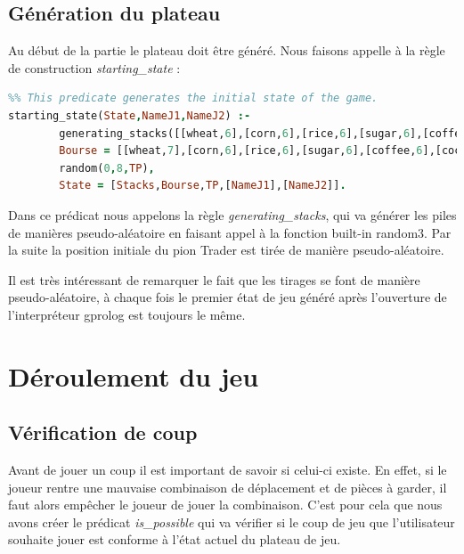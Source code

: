 \documentclass[a4paper, 11pt,twoside, leqno]{report}
\theoremstyle{plain}
\begin{document}
\subsection{Génération du plateau}
Au début de la partie le plateau doit être généré. Nous faisons appelle à la règle de construction \textit{starting\_{}state} :
\begin{lstlisting}[language=prolog]
%%%% starting_state(?State_To_Be_Generated,+Player_1's_Name,+Player_1's_Name)
%% This predicate generates the initial state of the game. 
starting_state(State,NameJ1,NameJ2) :-
		generating_stacks([[wheat,6],[corn,6],[rice,6],[sugar,6],[coffee,6],[cocoa,6]],Stacks,9),
		Bourse = [[wheat,7],[corn,6],[rice,6],[sugar,6],[coffee,6],[cocoa,6]],
		random(0,8,TP),
		State = [Stacks,Bourse,TP,[NameJ1],[NameJ2]].
\end{lstlisting}
Dans ce prédicat nous appelons la règle \textit{generating\_{}stacks}, qui va générer les piles de manières pseudo-aléatoire en faisant appel à la fonction built-in random\/{}3. Par la suite la position initiale du pion Trader est tirée de manière pseudo-aléatoire. 

Il est très intéressant de remarquer le fait que les tirages se font de manière pseudo-aléatoire, à chaque fois le premier état de jeu généré après l'ouverture de l'interpréteur gprolog est toujours le même. 
\section{Déroulement du jeu}
\subsection{Vérification de coup}
Avant de jouer un coup il est important de savoir si celui-ci existe. En effet, si le joueur rentre une mauvaise combinaison de déplacement et de pièces à garder, il faut alors empêcher le joueur de jouer la combinaison. C'est pour cela que nous avons créer le prédicat \textit{is\_{}possible} qui va vérifier si le coup de jeu que l'utilisateur souhaite jouer est conforme à l'état actuel du plateau de jeu.
\newpage
\end{document}
